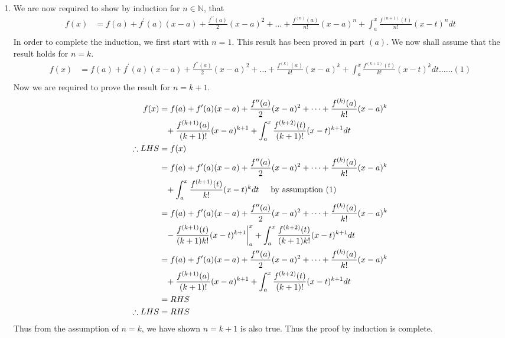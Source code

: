 \documentclass[a4paper]{article}
\begin{document}
\begin{enumerate}[label=\textbf{\arabic*.}]
\begin{enumerate}
		\pagebreak

		\item We are now required to show by induction for $\displaystyle{n \in \mathbb{N}}$, that
		\begin{align*}
		f(x) & = f(a) + f^{\prime}(a)(x-a) + \frac{f^{\prime \prime}(a)}{2}(x-a)^2 + \dots + \frac{f^{(n)}(a)}{n!}(x-a)^n + \int^{x}_{a}\frac{f^{(n+1)}(t)}{n!}(x-t)^ndt \\
		\end{align*}
		In order to complete the induction, we first start with $\displaystyle{n = 1}$. This result has been proved in part $\displaystyle{(a)}$. We now shall assume that the result holds for $\displaystyle{n=k}$.
		\begin{align*}
		f(x) & = f(a) + f^{\prime}(a)(x-a) + \frac{f^{\prime \prime}(a)}{2}(x-a)^2 + \dots + \frac{f^{(k)}(a)}{k!}(x-a)^k + \int^{x}_{a}\frac{f^{(k+1)}(t)}{k!}(x-t)^kdt \dots \dots (1)\\
		\end{align*}
		Now we are required to prove the result for $\displaystyle{n=k+1}$.
		\begin{align*}
		f(x) & = f(a) + f^{\prime}(a)(x-a) + \frac{f^{\prime \prime}(a)}{2}(x-a)^2 + \dots + \frac{f^{(k)}(a)}{k!}(x-a)^k\\ 
		& \phantom{=} + \frac{f^{(k+1)}(a)}{(k+1)!}(x-a)^{k+1} + \int^{x}_{a}\frac{f^{(k+2)}(t)}{(k+1)!}(x-t)^{k+1}dt\\
		\therefore LHS & = f(x)\\
		& = f(a) + f^{\prime}(a)(x-a) + \frac{f^{\prime \prime}(a)}{2}(x-a)^2 + \dots + \frac{f^{(k)}(a)}{k!}(x-a)^k\\ 
		& \phantom{=} + \int^{x}_{a}\frac{f^{(k+1)}(t)}{k!}(x-t)^kdt \hspace{5mm}\text{by assumption $(1)$}\\
		& = f(a) + f^{\prime}(a)(x-a) + \frac{f^{\prime \prime}(a)}{2}(x-a)^2 + \dots + \frac{f^{(k)}(a)}{k!}(x-a)^k\\ 
		& \phantom{=} - \frac{f^{(k+1)}(t)}{(k+1)k!}(x-t)^{k+1}\bigg|^{x}_{a} + \int^{x}_{a}\frac{f^{(k+2)}(t)}{(k+1)k!}(x-t)^{k+1}dt\\
		& = f(a) + f^{\prime}(a)(x-a) + \frac{f^{\prime \prime}(a)}{2}(x-a)^2 + \dots + \frac{f^{(k)}(a)}{k!}(x-a)^k\\ 
		& \phantom{=} + \frac{f^{(k+1)}(a)}{(k+1)!}(x-a)^{k+1} + \int^{x}_{a}\frac{f^{(k+2)}(t)}{(k+1)!}(x-t)^{k+1}dt\\
		& = RHS\\
		\therefore LHS & = RHS\\
		\end{align*}
		Thus from the assumption of $\displaystyle{n=k}$, we have shown $\displaystyle{n=k+1}$ is also true. Thus the proof by induction is complete.



\end{enumerate}
\end{enumerate}
\end{document}
